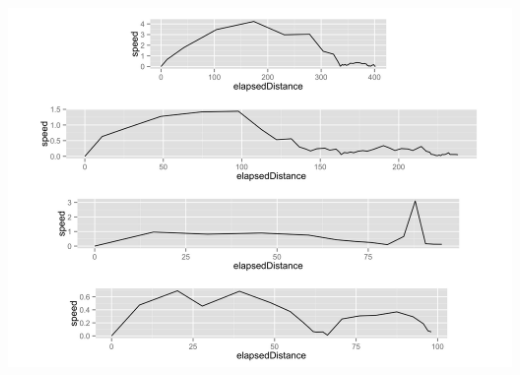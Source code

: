 \begin{appendices}
\begin{minipage}{\textwidth}
\begin{minipage}{0.5\linewidth}
	\end{minipage}
	\begin{minipage}{0.5\linewidth}
		\includegraphics[width=\linewidth]{images/plots/plot_speed_individual_263}
	\end{minipage}
	\label{fig:kvaliativ_persons_3}
\end{minipage}


\end{appendices}
